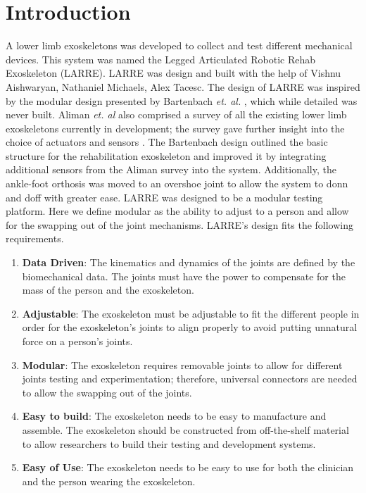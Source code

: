 \section{Introduction}
A lower limb exoskeletons was developed to collect and test different mechanical devices. This system was named the Legged Articulated Robotic Rehab Exoskeleton (LARRE). LARRE was design and built with the help of Vishnu Aishwaryan, Nathaniel Michaels,  Alex Tacesc. The design of LARRE was inspired by the modular design presented by Bartenbach \textit{et. al.} \cite{7523699}, which while detailed was never built.  Aliman \textit{et. al} also comprised a survey of all the existing lower limb exoskeletons currently in development; the survey gave further insight into the choice of actuators and sensors \cite{aliman2017design}. The Bartenbach design outlined the basic structure for the rehabilitation exoskeleton and improved it by integrating additional sensors from the Aliman survey into the system. Additionally, the ankle-foot orthosis was moved to an overshoe joint to allow the system to donn and doff with greater ease.
LARRE was designed to be a modular testing platform. Here we define modular as the ability to adjust to a person and allow for the swapping out of the joint mechanisms. LARRE's design fits the following requirements. 


\begin{enumerate}[noitemsep]
\item \textbf{Data Driven}: The kinematics and dynamics of the joints are defined by the biomechanical data. The joints must have the power to compensate for the mass of the person and the exoskeleton. 
\item \textbf{Adjustable}: The exoskeleton must be adjustable to fit the different people in order for the exoskeleton's joints to align properly to avoid putting unnatural force on a person's joints. 
\item \textbf{Modular}: The exoskeleton requires removable joints to allow for different joints testing and experimentation; therefore, universal connectors are needed to allow the swapping out of the joints. 
\item \textbf{Easy to build}: The exoskeleton needs to be easy to manufacture and assemble. The exoskeleton should be constructed from off-the-shelf material to allow researchers to build their testing and development systems. 
\item \textbf{Easy of Use}: The exoskeleton needs to be easy to use for both the clinician and the person wearing the exoskeleton. 
\end{enumerate}

